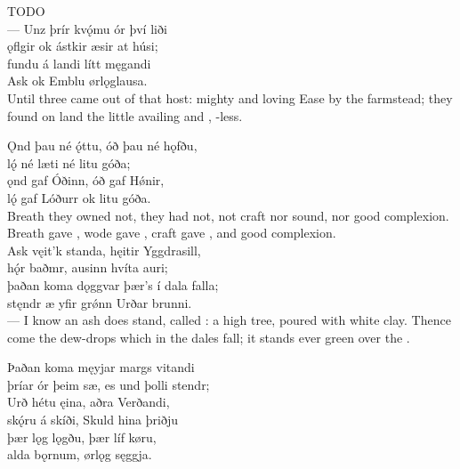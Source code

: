 \bvb TODO\\%

%

\bva — Unz þrír kvǫ́mu \hld ór því liði \\%
ǫflgir ok ástkir \hld æsir at húsi; \\%
fundu á landi \hld lítt męgandi \\%
Ask ok Emblu \hld ørlǫglausa.\\%

\bvb Until three came out of that host: mighty and loving Ease by the farmstead; they found on land the little availing  and , -less.\footnotemark[1]\\%

\bva Ǫnd þau né ǫ́ttu, \hld óð þau né hǫfðu, \\%
lǫ́ né læti \hld né litu góða; \\%
ǫnd gaf Óðinn, \hld óð gaf Hǿnir, \\%
lǫ́ gaf Lóðurr \hld ok litu góða.\\%

\bvb Breath they owned not,  they had not, not craft nor sound, nor good complexion. Breath gave , wode gave , craft gave , and good complexion.\\%

\bva Ask vęit’k standa, \hld hęitir Yggdrasill, \\%
hǫ́r baðmr, ausinn \hld hvíta auri; \\%
þaðan koma dǫggvar \hld þær’s í dala falla; \\%
stęndr æ yfir grǿnn \hld Urðar brunni.\\%

\bvb — I know an ash does stand, called : a high tree, poured with white clay\footnotemark[1]. Thence come the dew-drops which in the dales fall; it stands ever green over the .\\%

\bva Þaðan koma męyjar \hld margs vitandi \\%
þríar ór þeim sæ\footnotemark[1], \hld es und þolli stendr; \\%
Urð hétu ęina, \hld aðra Verðandi, \\%
skǫ́ru á skíði, \hld Skuld hina þriðju \\%
þær lǫg lǫgðu, \hld þær líf køru, \\%
alda bǫrnum, \hld ørlǫg sęggja.\\%

